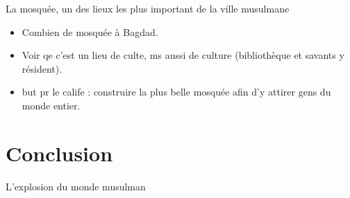 \documentclass{beamer}
\begin{document}
\begin{frame}{La mosquée, un des lieux les plus important de la ville musulmane}



\begin{itemize}
\item Combien de mosquée à Bagdad.
\item Voir qe c'est un lieu de culte, ms aussi de culture (bibliothèque et savants y résident).



\item but pr le calife : construire la plus belle mosquée afin d'y attirer gens du monde entier.
\end{itemize}



\end{frame}

\section{Conclusion}

\begin{frame}{L'explosion du monde musulman}


\end{frame}












  
\end{document}
